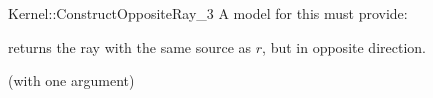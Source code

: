 \begin{ccRefFunctionObjectConcept}{Kernel::ConstructOppositeRay_3}
A model for this must provide:


{returns the ray with the same source as $r$, but in opposite direction.}

\ccRefines
{} (with one argument)

\ccSeeAlso
{} \\

\end{ccRefFunctionObjectConcept}
